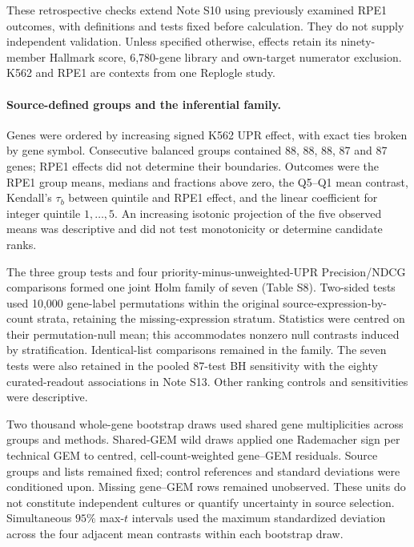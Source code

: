 \documentclass[a4paper,fleqn]{cas-sc}
\makeatletter
\DeclareRobustCommand{\rev}[1]{{\color{red}\def\@citecolor{black}\def\@linkcolor{red}\def\@urlcolor{red}#1}}
\makeatother
\begin{document}
\rev{These retrospective checks extend Note S10 using previously examined RPE1 outcomes, with definitions and tests fixed before calculation.} \rev{They do not supply independent validation.} \rev{Unless specified otherwise, effects retain its ninety-member Hallmark score, 6,780-gene library and own-target numerator exclusion.} \rev{K562 and RPE1 are contexts from one Replogle study.}

\paragraph{\rev{Source-defined groups and the inferential family.}}
\rev{Genes were ordered by increasing signed K562 UPR effect, with exact ties broken by gene symbol.} \rev{Consecutive balanced groups contained 88, 88, 88, 87 and 87 genes; RPE1 effects did not determine their boundaries.} \rev{Outcomes were the RPE1 group means, medians and fractions above zero, the Q5--Q1 mean contrast, Kendall's $\tau_b$ between quintile and RPE1 effect, and the linear coefficient for integer quintile $1,\ldots,5$.} \rev{An increasing isotonic projection of the five observed means was descriptive and did not test monotonicity or determine candidate ranks.}

\rev{The three group tests and four priority-minus-unweighted-UPR Precision/NDCG comparisons formed one joint Holm family of seven (Table S8).} \rev{Two-sided tests used 10,000 gene-label permutations within the original source-expression-by-count strata, retaining the missing-expression stratum.} \rev{Statistics were centred on their permutation-null mean; this accommodates nonzero null contrasts induced by stratification.} \rev{Identical-list comparisons remained in the family.} \rev{The seven tests were also retained in the pooled 87-test BH sensitivity with the eighty curated-readout associations in Note S13.} \rev{Other ranking controls and sensitivities were descriptive.}

\rev{Two thousand whole-gene bootstrap draws used shared gene multiplicities across groups and methods.} \rev{Shared-GEM wild draws applied one Rademacher sign per technical GEM to centred, cell-count-weighted gene--GEM residuals.} \rev{Source groups and lists remained fixed; control references and standard deviations were conditioned upon.} \rev{Missing gene--GEM rows remained unobserved.} \rev{These units do not constitute independent cultures or quantify uncertainty in source selection.} \rev{Simultaneous $95\%$ max-$t$ intervals used the maximum standardized deviation across the four adjacent mean contrasts within each bootstrap draw.}
\end{document}

